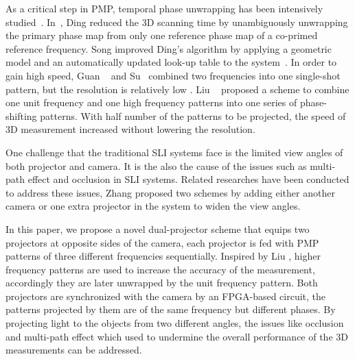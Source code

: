 \documentclass[10pt,letterpaper]{article}
\begin{document}
As a critical step in PMP, temporal phase unwrapping has been intensively studied~\cite{zuo16}. In~\cite{ding11}, Ding {\etal} reduced the 3D scanning time by unambiguously unwrapping the primary phase map from only one reference phase map of a co-primed reference frequency. Song {\etal} improved Ding's algorithm by applying a geometric model and an automatically updated look-up table to the system~\cite{song18}. In order to gain high speed, Guan {\etal}~\cite{guan03} and Su~\cite{suwh06} {\etal} combined two frequencies into one single-shot pattern, but the resolution is relatively low \cite{zhan06}. Liu {\etal}~\cite{kai10} proposed a scheme to combine one unit frequency and one high frequency patterns into one series of phase-shifting patterns. With half number of the patterns to be projected, the speed of 3D measurement increased without lowering the resolution.


One challenge that the traditional SLI systems face is the limited view angles of both projector and camera. It is the also the cause of the issues such as multi-path effect \cite{otoo16} and occlusion \cite{lin13} in SLI systems. Related researches have been conducted to address these issues, Zhang {\etal} proposed two schemes by adding either another camera or one extra projector in the system to widen the view angles.

In this paper, we propose a novel dual-projector scheme that equips two projectors at opposite sides of the camera, each projector is fed with PMP patterns of three different frequencies sequentially. Inspired by Liu {\etal}, higher frequency patterns are used to increase the accuracy of the measurement, accordingly they are later unwrapped by the unit frequency pattern. Both projectors are synchronized with the camera by an FPGA-based circuit, the patterns projected by them are of the same frequency but different phases. By projecting light to the objects from two different angles, the issues like occlusion and multi-path effect which used to undermine the overall performance of the 3D measurements can be addressed.
\end{document}
